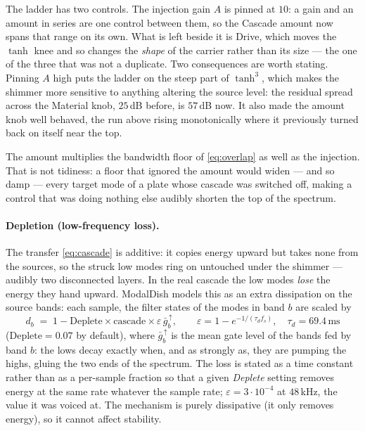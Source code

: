 \documentclass[11pt,a4paper]{article}
\begin{document}
The ladder has two controls. The injection gain $A$ is pinned at $10$: a
gain and an amount in series are one control between them, so the Cascade
amount now spans that range on its own. What is left beside it is Drive,
which moves the $\tanh$ knee and so changes the \emph{shape} of the
carrier rather than its size --- the one of the three that was not a
duplicate. Two consequences are worth stating. Pinning $A$ high puts the
ladder on the steep part of $\tanh^3$, which makes the shimmer more
sensitive to anything altering the source level: the residual spread across
the Material knob, $25$\,dB before, is $57$\,dB now. It also made the
amount knob well behaved, the run above rising monotonically where it
previously turned back on itself near the top.

The amount multiplies the bandwidth floor of \eqref{eq:overlap} as well as
the injection. That is not tidiness: a floor that ignored the amount would
widen --- and so damp --- every target mode of a plate whose cascade was
switched off, making a control that was doing nothing else audibly shorten
the top of the spectrum.

\paragraph{Depletion (low-frequency loss).}
The transfer \eqref{eq:cascade} is additive: it copies energy upward but
takes none from the sources, so the struck low modes ring on untouched
under the shimmer --- audibly two disconnected layers. In the real
cascade the low modes \emph{lose} the energy they hand upward. ModalDish
models this as an extra dissipation on the source bands: each sample, the
filter states of the modes in band $b$ are scaled by
%
\begin{equation}
  d_b \;=\; 1 - \mathrm{Deplete} \times \mathrm{cascade} \times
            \varepsilon\, \bar g_{b}^{\,\uparrow},
  \qquad \varepsilon = 1 - e^{-1/(\tau_d f_s)}, \quad \tau_d = 69.4\,\mathrm{ms}
\end{equation}
%
($\mathrm{Deplete} = 0.07$ by default), where $\bar g_b^{\,\uparrow}$ is
the mean gate level of the bands fed by band $b$: the lows decay exactly when, and as strongly as, they are
pumping the highs, gluing the two ends of the spectrum. The loss is stated
as a time constant rather than as a per-sample fraction so that a given
\emph{Deplete} setting removes energy at the same rate whatever the sample
rate; $\varepsilon = 3\cdot 10^{-4}$ at $48$\,kHz, the value it was voiced
at. The mechanism is purely dissipative (it only removes energy), so it
cannot affect stability.
\end{document}
